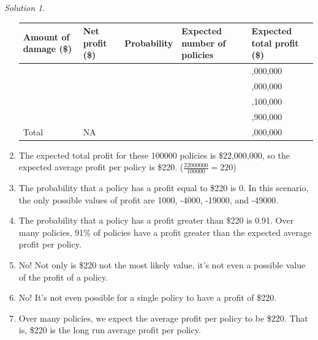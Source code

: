 \documentclass[
  letterpaper,
  DIV=11,
  numbers=noendperiod]{scrreprt}
\theoremstyle{plain}
\theoremstyle{definition}
\theoremstyle{definition}
\theoremstyle{definition}
\theoremstyle{remark}
\newtheorem{refsolution}{Solution}[chapter]
\begin{document}
\begin{tcolorbox}
\begin{refsolution}
\begin{enumerate}
  \begin{longtable}[]{@{}
    >{\raggedleft\arraybackslash}p{}
    >{\raggedleft\arraybackslash}p{}
    >{\raggedleft\arraybackslash}p{}
    >{\raggedleft\arraybackslash}p{}
    >{\raggedleft\arraybackslash}p{}@{}}
  \toprule\noalign{}
  \begin{minipage}[b]{\linewidth}\raggedleft
  Amount of damage (\$)
  \end{minipage} & \begin{minipage}[b]{\linewidth}\raggedleft
  Net profit (\$)
  \end{minipage} & \begin{minipage}[b]{\linewidth}\raggedleft
  Probability
  \end{minipage} & \begin{minipage}[b]{\linewidth}\raggedleft
  Expected number of policies
  \end{minipage} & \begin{minipage}[b]{\linewidth}\raggedleft
  Expected total profit (\$)
  \end{minipage} \\
  \midrule\noalign{}
  \endhead
  \bottomrule\noalign{}
  \endlastfoot
  0 & 1000 & 0.910 & 91000 & 91,000,000 \\
  5000 & -4000 & 0.070 & 7000 & -28,000,000 \\
  20000 & -19000 & 0.019 & 1900 & -36,100,000 \\
  50000 & -49000 & 0.001 & 100 & -4,900,000 \\
  Total & NA & 1 & 100000 & 22,000,000 \\
  \end{longtable}
\item
  The expected total profit for these 100000 policies is \$22,000,000,
  so the expected average profit per policy is \$220.
  (\(\frac{22000000}{100000} = 220\))
\item
  The probability that a policy has a profit equal to \$220 is 0. In
  this scenario, the only possible values of profit are 1000, -4000,
  -19000, and -49000.
\item
  The probability that a policy has a profit greater than \$220 is 0.91.
  Over many policies, 91\% of policies have a profit greater than the
  expected average profit per policy.
\item
  No! Not only is \$220 not the most likely value, it's not even a
  possible value of the profit of a policy.
\item
  No! It's not even possible for a single policy to have a profit of
  \$220.
\item
  Over many policies, we expect the average profit per policy to be
  \$220. That is, \$220 is the long run average profit per policy.
\end{enumerate}


\end{refsolution}
\end{tcolorbox}
\end{document}

